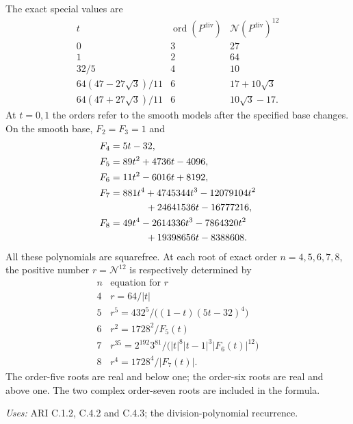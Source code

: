 \begin{proposition}\label{ari:C.4.4}
The exact special values are
\[
 \begin{array}{c|c|c}
 t&\operatorname{ord}(P^{\mathrm{div}})&\mathcal N(P^{\mathrm{div}})^{12}\\ \hline
 0&3&27\\
 1&2&64\\
 32/5&4&10\\
 64(47-27\sqrt3)/11&6&17+10\sqrt3\\
 64(47+27\sqrt3)/11&6&10\sqrt3-17 .
 \end{array}
\]
At $t=0,1$ the orders refer to the smooth models after the specified
base changes. On the smooth base, $F_2=F_3=1$ and
\[
 \begin{aligned}
 F_4&=5t-32,\\
 F_5&=89t^2+4736t-4096,\\
 F_6&=11t^2-6016t+8192,\\
 F_7&=881t^4+4745344t^3-12079104t^2\\
    &\hspace{13mm}+24641536t-16777216,\\
 F_8&=49t^4-2614336t^3-7864320t^2\\
    &\hspace{13mm}+19398656t-8388608.
 \end{aligned}
\]
All these polynomials are squarefree. At each root of exact order
$n=4,5,6,7,8$, the positive number $r=\mathcal N^{12}$ is respectively
determined by
\[
 \begin{array}{c|l}
 n&\text{equation for }r\\ \hline
 4&r=64/|t|\\
 5&r^5=432^5/\bigl((1-t)(5t-32)^4\bigr)\\
 6&r^2=1728^2/F_5(t)\\
 7&r^{35}=2^{192}3^{81}/
       \bigl(|t|^8|t-1|^3|F_6(t)|^{12}\bigr)\\
 8&r^4=1728^4/|F_7(t)|.
 \end{array}
\]
The order-five roots are real and below one; the order-six roots
are real and above one. The two complex order-seven roots are
included in the formula.
\end{proposition}
\noindent\textit{Uses:} ARI C.1.2, C.4.2 and C.4.3; the division-polynomial recurrence.\par
